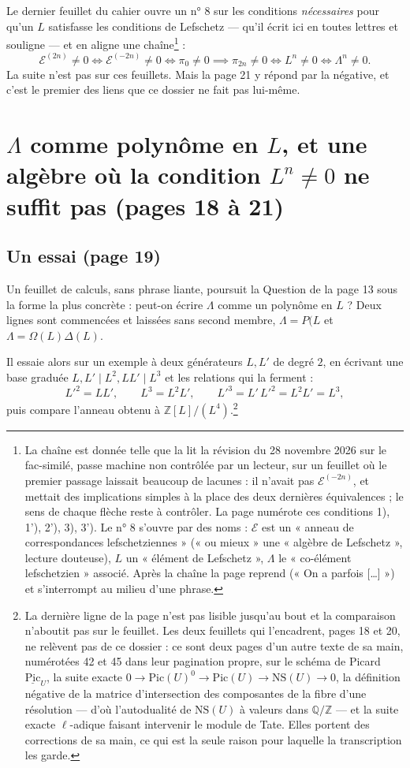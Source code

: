 \documentclass[11pt,a4paper]{article}
\begin{document}
Le dernier feuillet du cahier ouvre un n° 8 sur les conditions
\emph{nécessaires} pour qu'un $L$ satisfasse les conditions de Lefschetz ---
qu'il écrit ici en toutes lettres et souligne --- et en aligne une chaîne\footnote{La chaîne est donnée telle que la lit la révision du 28 novembre 2026 sur le fac-similé, passe machine non contrôlée par un lecteur, sur un feuillet où
le premier passage laissait beaucoup de lacunes : il n'avait pas
$\mathcal{E}^{(-2n)}$, et mettait des implications simples à la place des deux
dernières équivalences ; le sens de chaque flèche reste à contrôler. La page
numérote ces conditions 1), 1'), 2'), 3), 3'). Le n° 8 s'ouvre par des noms :
$\mathcal{E}$ est un « anneau de correspondances lefschetziennes » (« ou mieux »
une « algèbre de Lefschetz », lecture douteuse), $L$ un « élément de
Lefschetz », $\Lambda$ le « co-élément lefschetzien » associé. Après la chaîne
la page reprend (« On a parfois […] ») et s'interrompt au milieu d'une phrase.} :
\[
\mathcal{E}^{(2n)} \neq 0 \iff \mathcal{E}^{(-2n)} \neq 0 \iff \pi_{0} \neq 0
\implies \pi_{2n} \neq 0 \iff L^{n} \neq 0 \iff \Lambda^{n} \neq 0 .
\]
La suite n'est pas sur ces feuillets. Mais la page 21 y répond par la négative,
et c'est le premier des liens que ce dossier ne fait pas lui-même.

\section*{$\Lambda$ comme polynôme en $L$, et une algèbre où la condition $L^{n} \neq 0$ ne suffit pas (pages 18 à 21)}

\subsection*{Un essai (page 19)}

Un feuillet de calculs, sans phrase liante, poursuit la Question de la page 13
sous la forme la plus concrète : peut-on écrire $\Lambda$ comme un polynôme en
$L$ ? Deux lignes sont commencées et laissées sans second membre,
$\Lambda = P(L$ et $\Lambda = \Omega(L)\Delta(L)$.

Il essaie alors sur un exemple à deux générateurs $L, L'$ de degré $2$, en
écrivant une base graduée $L, L' \mid L^{2}, LL' \mid L^{3}$ et les relations
qui la ferment :
\[
L'^{2} = LL', \qquad L^{3} = L^{2}L', \qquad
L'^{3} = L'\,L'^{2} = L^{2}L' = L^{3},
\]
puis compare l'anneau obtenu à $\mathbb{Z}[L]/(L^{4})$.\footnote{La dernière
ligne de la page n'est pas lisible jusqu'au bout et la comparaison n'aboutit
pas sur le feuillet. Les deux feuillets qui l'encadrent, pages 18 et 20, ne
relèvent pas de ce dossier : ce sont deux pages d'un autre texte de sa main,
numérotées 42 et 45 dans leur pagination propre, sur le schéma de Picard
$\underline{\mathrm{Pic}}_{U}$, la suite exacte
$0 \to \mathrm{Pic}(U)^{0} \to \mathrm{Pic}(U) \to \mathrm{NS}(U) \to 0$, la
définition négative de la matrice d'intersection des composantes de la fibre
d'une résolution --- d'où l'autodualité de $\mathrm{NS}(U)$ à valeurs dans
$\mathbb{Q}/\mathbb{Z}$ --- et la suite exacte $\ell$-adique faisant intervenir
le module de Tate. Elles portent des corrections de sa main, ce qui est la
seule raison pour laquelle la transcription les garde.}
\end{document}
